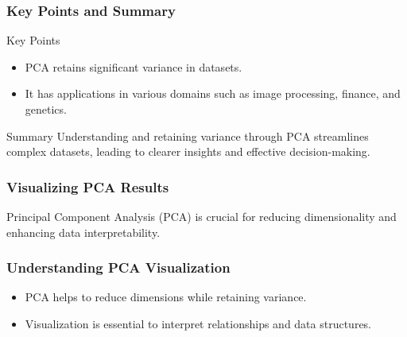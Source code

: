 \documentclass[aspectratio=169]{beamer}
\begin{document}
\begin{frame}[fragile]
    \frametitle{Key Points and Summary}
    \begin{block}{Key Points}
        \begin{itemize}
            \item PCA retains significant variance in datasets.
            \item It has applications in various domains such as image processing, finance, and genetics.
        \end{itemize}
    \end{block}
    \begin{block}{Summary}
        Understanding and retaining variance through PCA streamlines complex datasets, leading to clearer insights and effective decision-making.
    \end{block}
\end{frame}

\begin{frame}[fragile]
    \frametitle{Visualizing PCA Results}
    Principal Component Analysis (PCA) is crucial for reducing dimensionality and enhancing data interpretability.
\end{frame}

\begin{frame}[fragile]
    \frametitle{Understanding PCA Visualization}
    \begin{itemize}
        \item PCA helps to reduce dimensions while retaining variance.
        \item Visualization is essential to interpret relationships and data structures.
    \end{itemize}
\end{frame}
\end{document}

